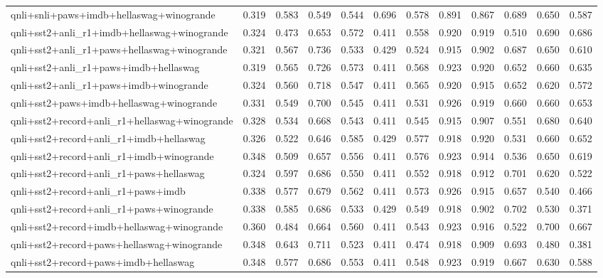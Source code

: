 \begin{table}[t]
\begin{tabular}{lrrrrrrrrrrr}
    qnli+snli+paws+imdb+hellaswag+winogrande & 0.319 & 0.583 & 0.549 & 0.544 & 0.696 & 0.578 & 0.891 & 0.867 & 0.689 & 0.650 & 0.587 \\
    qnli+sst2+anli\_r1+imdb+hellaswag+winogrande & 0.324 & 0.473 & 0.653 & 0.572 & 0.411 & 0.558 & 0.920 & 0.919 & 0.510 & 0.690 & 0.686 \\
    qnli+sst2+anli\_r1+paws+hellaswag+winogrande & 0.321 & 0.567 & 0.736 & 0.533 & 0.429 & 0.524 & 0.915 & 0.902 & 0.687 & 0.650 & 0.610 \\
    qnli+sst2+anli\_r1+paws+imdb+hellaswag & 0.319 & 0.565 & 0.726 & 0.573 & 0.411 & 0.568 & 0.923 & 0.920 & 0.652 & 0.660 & 0.635 \\
    qnli+sst2+anli\_r1+paws+imdb+winogrande & 0.324 & 0.560 & 0.718 & 0.547 & 0.411 & 0.565 & 0.920 & 0.915 & 0.652 & 0.620 & 0.572 \\
    qnli+sst2+paws+imdb+hellaswag+winogrande & 0.331 & 0.549 & 0.700 & 0.545 & 0.411 & 0.531 & 0.926 & 0.919 & 0.660 & 0.660 & 0.653 \\
    qnli+sst2+record+anli\_r1+hellaswag+winogrande & 0.328 & 0.534 & 0.668 & 0.543 & 0.411 & 0.545 & 0.915 & 0.907 & 0.551 & 0.680 & 0.640 \\
    qnli+sst2+record+anli\_r1+imdb+hellaswag & 0.326 & 0.522 & 0.646 & 0.585 & 0.429 & 0.577 & 0.918 & 0.920 & 0.531 & 0.660 & 0.652 \\
    qnli+sst2+record+anli\_r1+imdb+winogrande & 0.348 & 0.509 & 0.657 & 0.556 & 0.411 & 0.576 & 0.923 & 0.914 & 0.536 & 0.650 & 0.619 \\
    qnli+sst2+record+anli\_r1+paws+hellaswag & 0.324 & 0.597 & 0.686 & 0.550 & 0.411 & 0.552 & 0.918 & 0.912 & 0.701 & 0.620 & 0.522 \\
    qnli+sst2+record+anli\_r1+paws+imdb & 0.338 & 0.577 & 0.679 & 0.562 & 0.411 & 0.573 & 0.926 & 0.915 & 0.657 & 0.540 & 0.466 \\
    qnli+sst2+record+anli\_r1+paws+winogrande & 0.338 & 0.585 & 0.686 & 0.533 & 0.429 & 0.549 & 0.918 & 0.902 & 0.702 & 0.530 & 0.371 \\
    qnli+sst2+record+imdb+hellaswag+winogrande & 0.360 & 0.484 & 0.664 & 0.560 & 0.411 & 0.543 & 0.923 & 0.916 & 0.522 & 0.700 & 0.667 \\
    qnli+sst2+record+paws+hellaswag+winogrande & 0.348 & 0.643 & 0.711 & 0.523 & 0.411 & 0.474 & 0.918 & 0.909 & 0.693 & 0.480 & 0.381 \\
    qnli+sst2+record+paws+imdb+hellaswag & 0.348 & 0.577 & 0.686 & 0.553 & 0.411 & 0.548 & 0.923 & 0.919 & 0.667 & 0.630 & 0.588 \\

\end{tabular}
\end{table}
